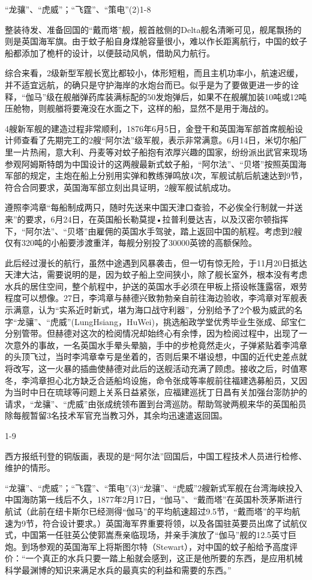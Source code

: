 \documentclass[12pt,UTF8]{ctexbook}
\begin{document}
“龙骧”、“虎威”；“飞霆”、“策电”(2)1-8

整装待发、准备回国的“戴而塔”舰，舰首舷侧的Delta舰名清晰可见，舰尾飘扬的则是英国海军旗。由于蚊子船自身煤舱容量很小，难以作长距离航行，中国的蚊子船都添加了桅杆的设计，以便鼓动风帆，借助风力航行。

综合来看，2级新型军舰长宽比都较小，体形短粗，而且主机功率小，航速迟缓，并不适宜远航，的确只是守护海岸的水炮台而已。似乎是为了要做更进一步的诠释，“伽马”级在舰艏弹药库装满标配的50发炮弹后，如果不在舰艉加装10吨或12吨压舱物，则舰艏将要淹没在水面之下，这样的船，显然不是用于海战的。

4艘新军舰的建造过程非常顺利，1876年6月5日，金登干和英国海军部首席舰船设计师查看了先期完工的2艘“阿尔法”级军舰，表示非常满意。6月14日，米切尔船厂里一片热闹，意大利、丹麦等对蚊子船抱有浓厚兴趣的国家，纷纷派出武官来现场参观阿姆斯特朗为中国设计的这两艘最新式蚊子船，“阿尔法”、“贝塔”按照英国海军部的规定，主炮在船上分别用实弹和教练弹鸣放4次，军舰试航后航速达到9节，符合合同要求，英国海军部立刻出具证明，2艘军舰试航成功。

遵照李鸿章“每船制成两只，随时先送来中国天津口查验，不必俟全行制就一并送来”的要求，6月24日，在英国船长勒莫提•拉普利曼达吉，以及汉密尔顿指挥下，“阿尔法”、“贝塔”由雇佣的英国水手驾驶，踏上返回中国的航程。考虑到2艘仅有320吨的小船要涉渡重洋，每舰分别投了30000英镑的高额保险。

此后经过漫长的航行，虽然中途遇到风暴袭击，但一切有惊无险，于11月20日抵达天津大沽，需要说明的是，因为蚊子船上空间狭小，除了舰长室外，根本没有考虑水兵的居住空间，整个航程中，护送的英国水手必须在甲板上搭设帐篷露宿，艰劳程度可以想像。27日，李鸿章与赫德兴致勃勃亲自前往海边验收，李鸿章对军舰表示满意，认为“实系近时新式，堪为海口战守利器”，分别给予了2个极为威武的名字“龙骧”、“虎威”(LungHsiang，HuWei)，挑选船政学堂优秀毕业生张成、邱宝仁分别管带。但赫德对这次的检阅情况却始终心有余悸，因为检阅过程中，出现了一次意外的事故，一名英国水手晕头晕脑，手中的步枪竟然走火，子弹紧贴着李鸿章的头顶飞过，当时李鸿章幸亏是坐着的，否则后果不堪设想，中国的近代史差点就将改写，这一火暴的插曲使赫德对此后的送舰活动充满了顾虑。接收之后，时值寒冬，李鸿章担心北方缺乏合适船坞设施，命令张成等率舰前往福建选募船员，又因为当时中日在琉球等问题上关系日益紧张，应福建巡抚丁日昌有关加强台澎防护的请求，“龙骧”、“虎威”由张成统领布置到台湾巡防。帮助驾驶两舰来华的英国船员除每舰暂留3名技术军官充当教习外，其余均迅速遣返回国。

1-9

西方报纸刊登的铜版画，表现的是“阿尔法”回国后，中国工程技术人员进行检修、维护的情形。

“龙骧”、“虎威”；“飞霆”、“策电”(3)“龙骧”、“虎威”2艘新式军舰在台湾海峡投入中国海防第一线后不久，1877年2月17日，“伽马”、“戴而塔”在英国朴茨茅斯进行航试（此前在纽卡斯尔已经测得“伽马”的平均航速超过9.5节，“戴而塔”的平均航速为9节，符合设计要求。）英国海军界重要将领，以及各国驻英要员出席了试航仪式，中国第一任驻英公使郭嵩焘亲临现场，并亲手演放了“伽马”舰的12.5英寸巨炮。到场参观的英国海军上将斯图尔特（Stewart），对中国的蚊子船给予高度评价：“一个真正的水兵只要一踏上船就会感到，这正是他所要的东西，是应用机械科学最渊博的知识来满足水兵的最真实的利益和需要的东西。”
\end{document}
